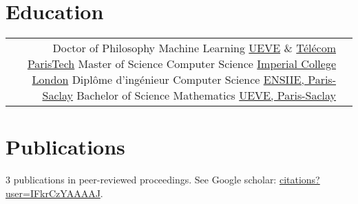 \documentclass[10pt]{article} %
\begin{document}
\begin{paracol}{2}
\section{Education}
%
%
%
%
%
\begin{supertabular}{rl} %
%
%
    {Doctor of Philosophy} %
    {} %
    {Machine Learning} %
    {\href{https://www.ibisc.univ-evry.fr/}{UEVE} \&
     \href{https://ltci.telecom-paristech.fr/}{T\'el\'ecom ParisTech}}
%
%
    {Master of Science} %
    {} %
    {Computer Science} %
    {\href{http://www.imperial.ac.uk/computing}{Imperial College London}} %
%
%
    {Dipl\^ome d'ing\'enieur} %
    {} %
    {Computer Science} %
    {\href{http://www.ensiie.fr/}{ENSIIE, Paris-Saclay}}
%
%
    {Bachelor of Science} %
    {} %
    {Mathematics} %
    {\href{https://www.univ-evry.fr/accueil.html}{UEVE, Paris-Saclay}}
%
%
\end{supertabular}
%
%
\section{Publications}
3 publications in peer-reviewed proceedings. See Google scholar:
\href{https://scholar.google.fr/citations?user=IFkrCzYAAAAJ}{citations?user=IFkrCzYAAAAJ}.
\medskip
%
%

\end{paracol}
\end{document}
